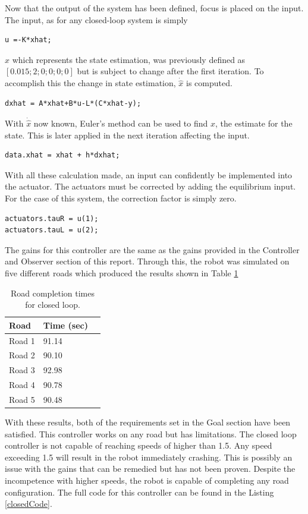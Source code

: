 \documentclass[12pt]{article}
\begin{document}
Now that the output of the system has been defined, focus is placed on the input. The input, as for any closed-loop system is simply 
\begin{lstlisting}[frame=single]
%Input using estimated state
u =-K*xhat;
\end{lstlisting}
$\hat{x}$ which represents the state estimation, was previously defined as $[0.015; 2; 0; 0; 0; 0]$ but is subject to change after the first iteration. To accomplish this the change in state estimation, $\dot{\hat{x}}$ is computed.
\begin{lstlisting}[frame=single]
%Next step for dxhat
dxhat = A*xhat+B*u-L*(C*xhat-y);
\end{lstlisting}
With $\dot{\hat{x}}$ now known, Euler's method can be used to find $\hat{x}$, the estimate for the state. This is later applied in the next iteration affecting the input.
\begin{lstlisting}[frame=single]
%Euler's Method for finding xhat
data.xhat = xhat + h*dxhat;
\end{lstlisting}
With all these calculation made, an input can confidently be implemented into the actuator. The actuators must be corrected by adding the equilibrium input. For the case of this system, the correction factor is simply zero. 
\begin{lstlisting}[frame=single]
%Applying controller to the input
actuators.tauR = u(1);
actuators.tauL = u(2);
\end{lstlisting}
The gains for this controller are the same as the gains provided in the Controller and Observer section of this report. Through this, the robot was simulated on five different roads which produced the results shown in Table \ref{roadTimes}
\begin{table}[h!]
\centering
\begin{tabular}{|p{4cm}|p{4cm}|p{4cm}|}
\hline
Road & Time (sec)\\
\hline \hline
Road 1 & 91.14\\
Road 2 &  90.10\\
Road 3 & 92.98\\ 
Road 4 & 90.78\\ 
Road 5 & 90.48\\
\hline
\end{tabular}
\caption{Road completion times for closed loop.\label{roadTimes}}
\end{table}
With these results, both of the requirements set in the Goal section have been satisfied. This controller works on any road but has limitations. The closed loop controller is not capable of reaching speeds of higher than 1.5. Any speed exceeding 1.5 will result in the robot immediately crashing. This is possibly an issue with the gains that can be remedied but has not been proven. Despite the incompetence with higher speeds, the robot is capable of completing any road configuration. The full code for this controller can be found in the Listing \ref{closedCode}.
\end{document}
